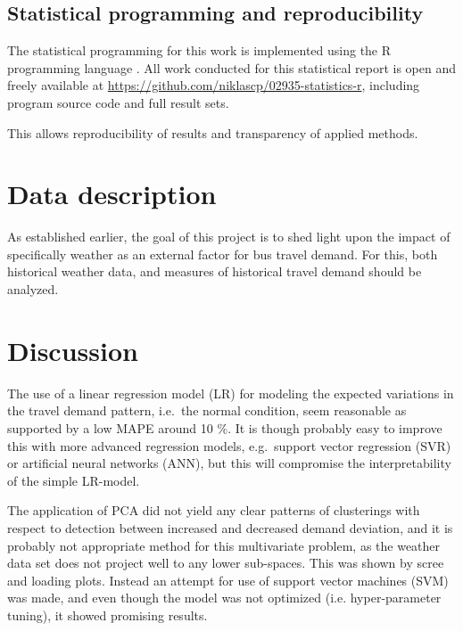 \documentclass[a4paper,11pt]{article}
\begin{document}
\subsection{Statistical programming and reproducibility}\label{ch:reproducibility}
The statistical programming for this work is implemented using the R programming language \citep{R}. All work conducted for this statistical report is open and freely available at \url{https://github.com/niklascp/02935-statistics-r}, including program source code and full result sets. 

This allows reproducibility of results and transparency of applied methods.



\clearpage

\section{Data description}\label{ch:desc}
As established earlier, the goal of this project is to shed light upon the impact of specifically weather as an external factor for bus travel demand. For this, both historical weather data, and measures of historical travel demand should be analyzed.


\clearpage


\clearpage


\clearpage


\clearpage

\section{Discussion}
The use of a linear regression model (LR) for modeling the expected variations in the travel demand pattern, i.e.\ the normal condition, seem reasonable as supported by a low MAPE around 10 \%. It is though probably easy to improve this with more advanced regression models, e.g.\ support vector regression (SVR) or artificial neural networks (ANN), but this will compromise the interpretability of the simple LR-model.

The application of PCA did not yield any clear patterns of clusterings with respect to detection between increased and decreased demand deviation, and it is probably not appropriate method for this multivariate
problem, as the weather data set does not project well to any lower sub-spaces. This was shown by scree and loading plots. Instead an attempt for use of support vector machines (SVM) was made, and even though the model was not optimized (i.e. hyper-parameter tuning), it showed promising results.
\end{document}
